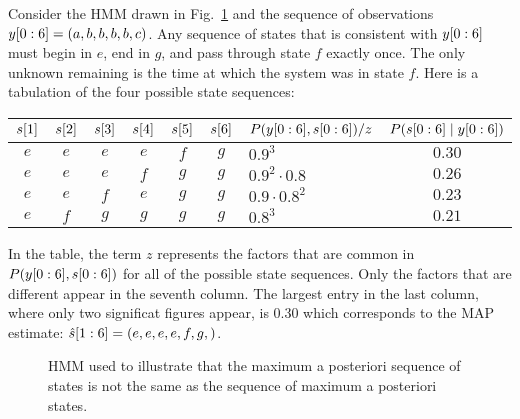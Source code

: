 Consider the HMM drawn in Fig.~\ref{fig:sequenceMAP} and the sequence
of observations $y[0:6] = (a,b,b,b,b,c)$.  Any sequence of
states that is consistent with $y[0:6]$ must begin in $e$, end
in $g$, and pass through state $f$ exactly once.  The only unknown
remaining is the time at which the system was in state $f$.  Here is a
tabulation of the four possible state sequences:
\begin{center}
  \begin{tabular}{|cccccc|l|c|}
    \hline
    ${s}{[1]}$ &  ${s}{[2]}$ &  ${s}{[3]}$ & 
    ${s}{[4]}$ &  ${s}{[5]}$ &  ${s}{[6]}$ &
    $P(y[0:6],s[0:6])/z$ & 
    $P(s[0:6]\mid y[0:6])$ \\
    \hline
    $e$ & $e$ & $e$ & $e$ & $f$ & $g$ & $0.9^3$           & $ 0.30$ \\
    $e$ & $e$ & $e$ & $f$ & $g$ & $g$ & $0.9^2\cdot 0.8$  & $ 0.26$ \\
    $e$ & $e$ & $f$ & $e$ & $g$ & $g$ & $0.9 \cdot 0.8^2$ & $ 0.23$ \\
    $e$ & $f$ & $g$ & $g$ & $g$ & $g$ & $0.8^3$           & $ 0.21$ \\\hline
  \end{tabular}
\end{center}
In the table, the term $z$ represents the factors that are common in
$P(y[0:6],s[0:6])$ for all of the possible state
sequences.  Only the factors that are different appear in the seventh
column.  The largest entry in the last column, where only two
significat figures appear, is 0.30 which corresponds to the MAP
estimate: $\hat s[1:6] = (e,e,e,e,f,g,)$.
\begin{figure}[htbp]
  \centering{\plotsize%
     
  }  
  \caption{HMM used to illustrate that the maximum a posteriori sequence of states is
    not the same as the sequence of maximum a posteriori states.}
\label{fig:sequenceMAP}
\end{figure}


